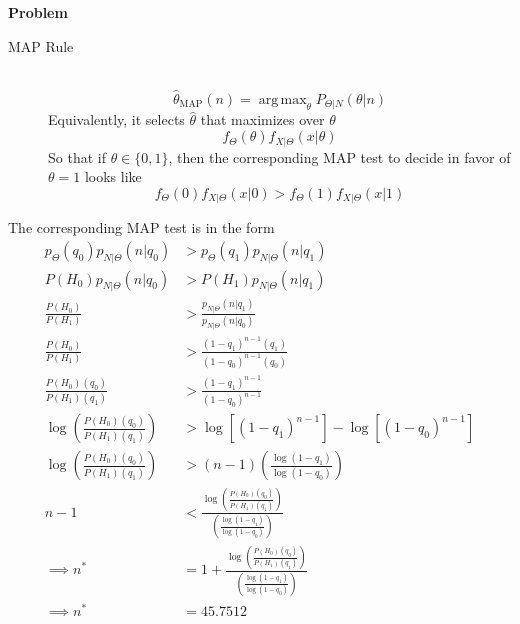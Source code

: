 \documentclass[12pt]{article}
\newenvironment{Ex}{\textbf{Problem}\vspace{.75em}\\}{}
\DeclareMathOperator*{\argmax}{arg\,max}
\begin{document}
\begin{enumerate}
\begin{Ex}
\begin{solution}
\begin{enumerate}
        \begin{mdframed}[backgroundcolor=silver]
          \begin{description}
          \item[MAP Rule] \hfill \\
            $$\hat{\theta}_{\text{MAP}}(n) = \argmax_{\theta}
            P_{\Theta|N}(\theta|n)$$
            Equivalently, it selects $\hat{\theta}$ that maximizes
            over $\theta$
            $$f_{\Theta}(\theta)f_{X|\Theta}(x|\theta)$$
            So that if $\theta\in\{0,1\}$, then the corresponding MAP
            test to decide in favor of $\theta=1$ looks like
            $$f_{\Theta}(0)f_{X|\Theta}(x|0) >
            f_{\Theta}(1)f_{X|\Theta}(x|1)$$
          \end{description}
        \end{mdframed}

        The corresponding MAP test is in the form
        \begin{equation}
          \label{eq:1a-map-test}
          \begin{aligned}
            p_{\Theta}(q_0)p_{N|\Theta}(n|q_0)
            &> p_{\Theta}(q_1)p_{N|\Theta}(n|q_1) \\
            P(H_0)p_{N|\Theta}(n|q_0)
            &> P(H_1)p_{N|\Theta}(n|q_1) \\
            \frac{P(H_0)}{P(H_1)}
            &> \frac{p_{N|\Theta}(n|q_1)}{p_{N|\Theta}(n|q_0)} \\
            \frac{P(H_0)}{P(H_1)}
            &> \frac{(1-q_1)^{n-1}(q_1)}{(1-q_0)^{n-1}(q_0)} \\
            \frac{P(H_0)(q_0)}{P(H_1)(q_1)}
            &> \frac{(1-q_1)^{n-1}}{(1-q_0)^{n-1}} \\
            \log\left(\frac{P(H_0)(q_0)}{P(H_1)(q_1)}\right)
            &> \log[(1-q_1)^{n-1}] - \log[(1-q_0)^{n-1}] \\
            \log\left(\frac{P(H_0)(q_0)}{P(H_1)(q_1)}\right)
            &> (n-1)\left(\frac{\log(1-q_1)}{\log(1-q_0)}\right) \\
            n-1 &<
            \frac{\log\left(\frac{P(H_0)(q_0)}{P(H_1)(q_1)}\right)}
            {\left(\frac{\log(1-q_1)}{\log(1-q_0)}\right)} \\
            \implies n^* &= 1 +
            \frac{\log\left(\frac{P(H_0)(q_0)}{P(H_1)(q_1)}\right)}
            {\left(\frac{\log(1-q_1)}{\log(1-q_0)}\right)} \\
            \implies n^* &= 45.7512 \\
          \end{aligned}
        \end{equation}
        

\end{enumerate}
\end{solution}
\end{Ex}
\end{enumerate}
\end{document}
